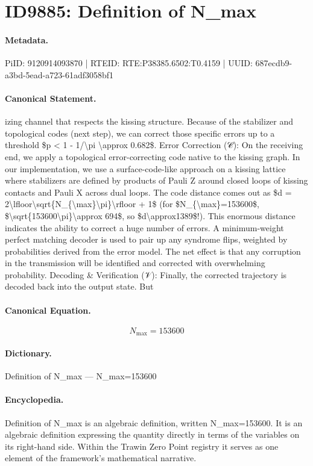 \section*{ID9885: Definition of N\_max}
\paragraph{Metadata.}
PiID: 9120914093870 | RTEID: RTE:P38385.6502:T0.4159 | UUID: 687ecdb9-a3bd-5ead-a723-61adf3058bf1

\paragraph{Canonical Statement.}
izing channel that respects the kissing structure. Because of the stabilizer and topological codes (next step), we can correct those specific errors up to a threshold \$p < 1 - 1/\textbackslash{}pi \textbackslash{}approx 0.682\$. Error Correction (𝒞): On the receiving end, we apply a topological error-correcting code native to the kissing graph. In our implementation, we use a surface-code-like approach on a kissing lattice where stabilizers are defined by products of Pauli Z around closed loops of kissing contacts and Pauli X across dual loops. The code distance comes out as \$d = 2\textbackslash{}lfloor\textbackslash{}sqrt\{N\_\{\textbackslash{}max\}\textbackslash{}pi\}\textbackslash{}rfloor + 1\$ (for \$N\_\{\textbackslash{}max\}=153600\$, \$\textbackslash{}sqrt\{153600\textbackslash{}pi\}\textbackslash{}approx 694\$, so \$d\textbackslash{}approx1389\$!). This enormous distance indicates the ability to correct a huge number of errors. A minimum-weight perfect matching decoder is used to pair up any syndrome flips, weighted by probabilities derived from the error model. The net effect is that any corruption in the transmission will be identified and corrected with overwhelming probability. Decoding \& Verification (𝒱): Finally, the corrected trajectory is decoded back into the output state. But

\paragraph{Canonical Equation.}
\[
N_{\max}=153600
\]

\paragraph{Dictionary.}
Definition of N\_max — N\_max=153600

\paragraph{Encyclopedia.}
Definition of N\_max is an algebraic definition, written N\_max=153600. It is an algebraic definition expressing the quantity directly in terms of the variables on its right-hand side. Within the Trawin Zero Point registry it serves as one element of the framework's mathematical narrative.
